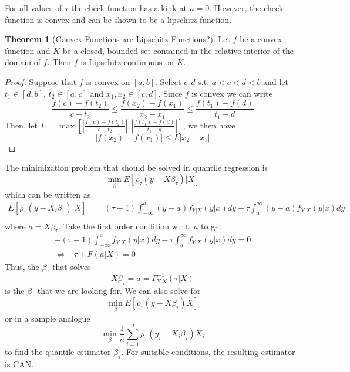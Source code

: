 \documentclass[12pt]{article}
\theoremstyle{definition}
\theoremstyle{property}
\theoremstyle{assumption}
\theoremstyle{example}
\theoremstyle{comment}
\newtheorem{theorem}{Theorem}[section]
\begin{document}
For all values of $\tau$ the check function has a kink at $u=0$. However, the check function is convex and can be shown to be a lipschitz function. 
\begin{mdframed}[backgroundcolor=green!5] 
\begin{theorem}[Convex Functions are Lipschitz Functions?] Let $f$ be a convex function and $K$ be a closed, bounded set contained in the relative interior of the domain of $f$. Then $f$ is Lipschitz continuous on $K$. 
\begin{proof}
Suppose that $f$ is convex on $[a,b]$. Select $c,d$ s.t. $a<c<d<b$ and let $t_1\in[d,b]$, $t_2\in[a,c]$ and $x_1,x_2\in[c,d]$. Since $f$ is convex we can write
\[
\frac{f(c)-f(t_2)}{c-t_2}\leq \frac{f(x_2)-f(x_1)}{x_2-x_1}\leq \frac{f(t_1)-f(d)}{t_1-d}
\]
Then, let $L=\max\left[\left|\frac{f(c)-f(t_2)}{c-t_2}\right|,\left|\frac{f(t_1)-f(d)}{t_1-d}\right|\right]$, we then have 
\[|f(x_2)-f(x_1)|\leq L|x_2-x_1|\]
\end{proof}
\end{theorem}
\end{mdframed}
\par
The minimization problem that should be solved in quantile regression is
\[
\min_\beta E[ \rho_\tau(y-X\beta_\tau)|X]
\]
which can be written as
\begin{align*}
E[ \rho_\tau(y-X_i\beta_\tau)|X] &= (\tau-1)\int_{-\infty}^{a} (y-a)f_{Y|X}(y|x)dy+ \tau\int_{a}^\infty(y-a) f_{Y|X}(y|x)dy\\
\end{align*}
where $a=X\beta_\tau$. Take the first order condition w.r.t. $a$ to get
\begin{gather*}
-(\tau-1)\int_{-\infty}^a f_{Y|X}(y|x)dy - \tau\int_a^\infty f_{Y|X}(y|x)dy=0\\
\iff -\tau + F(a|X)=0
\end{gather*}
Thus, the $\beta_\tau$ that solves
\[
X\beta_\tau=a=F^{-1}_{Y|X}(\tau|X)
\]
is the $\beta_\tau$ that we are looking for. We can also solve for
\[
\min_\beta E[\rho_\tau(y-X\beta_\tau)X]
\] 
or in a sample analogue
\[
\min_\beta \frac{1}{n}\sum_{i=1}^n \rho_\tau(y_i-X_i\beta_\tau)X_i
\]
to find the quantile estimator $\beta_\tau$. For suitable conditions, the resulting estimator is CAN. 
\end{document}
